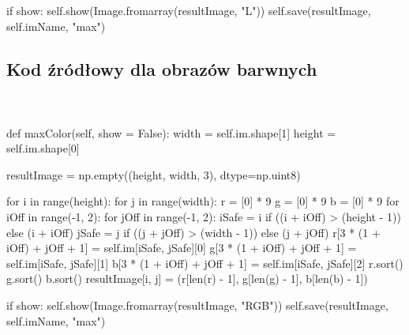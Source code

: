 \documentclass[final,a4paper,openany,12pt]{mwbk}
\begin{document}
if show: \newline
\indent self.show(Image.fromarray(resultImage, "L")) \newline
\indent self.save(resultImage, self.imName, "max") \newline


\newpage
\subsection*{Kod źródłowy dla obrazów barwnych}
\hfill
\\\\
\noindent def maxColor(self, show = False): \newline
\indent width = self.im.shape[1] \newline
\indent height = self.im.shape[0] \newline

resultImage = np.empty((height, width, 3), dtype=np.uint8) \newline

for i in range(height): \newline
\indent for j in range(width): \newline
\indent r = [0] * 9 \newline
\indent g = [0] * 9 \newline
\indent b = [0] * 9 \newline
\indent for iOff in range(-1, 2): \newline
\indent for jOff in range(-1, 2): \newline
\indent iSafe = i if ((i + iOff) > (height - 1)) else (i + iOff) \newline
\indent jSafe = j if ((j + jOff) > (width - 1)) else (j + jOff) \newline
\indent r[3 * (1 + iOff) + jOff + 1] = self.im[iSafe, jSafe][0] \newline
\indent g[3 * (1 + iOff) + jOff + 1] = self.im[iSafe, jSafe][1] \newline
\indent b[3 * (1 + iOff) + jOff + 1] = self.im[iSafe, jSafe][2] \newline
\indent r.sort() \newline
\indent g.sort() \newline
\indent b.sort() \newline
\indent resultImage[i, j] = (r[len(r) - 1], g[len(g) - 1], b[len(b) - 1]) \newline

if show: \newline
\indent self.show(Image.fromarray(resultImage, "RGB")) \newline
\indent self.save(resultImage, self.imName, "max") \newline
\end{document}
